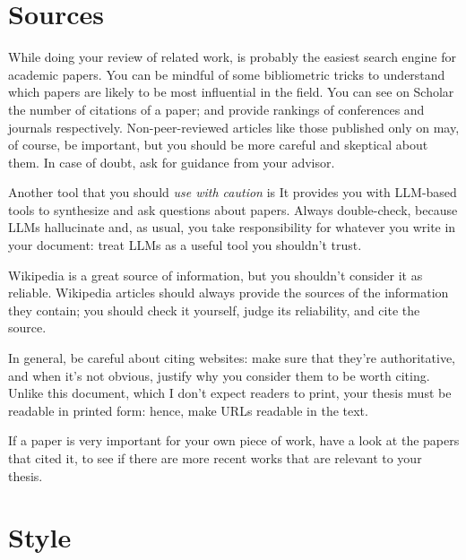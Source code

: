 \section{Sources}

While doing your review of related work, 
is probably the easiest search engine for academic papers. You can be mindful of some
bibliometric tricks to understand which papers are likely to be most influential in the field.
You can see on Scholar the number of citations of a paper;
 and
 provide rankings of conferences and journals
respectively. Non-peer-reviewed articles like those published only on
 may, of course, be important, but you should be more careful
and skeptical about them. In case of doubt, ask for guidance from your advisor.

Another tool that you should \emph{use with caution} is  It provides you with \ac{LLM}-based tools to synthesize and ask questions about papers. Always double-check, because \acp{LLM} hallucinate and, as usual, you take responsibility for whatever you write in your document: treat \acp{LLM} as a useful tool you shouldn't trust.

Wikipedia is a great source of information, but you shouldn't consider it as reliable.
Wikipedia articles should always provide the sources of the information they contain; you
should check it yourself, judge its reliability, and cite the source.

In general, be careful about citing websites: make sure that they're authoritative, and when it's not obvious, justify why you consider them to be worth citing. Unlike this document, which I don't expect readers to print, your thesis must be readable in printed form: hence, make URLs readable in the text.

If a paper is very important for your own piece of work, have a look at the papers
that cited it, to see if there are more recent works that are relevant to your thesis.

\section{Style}

